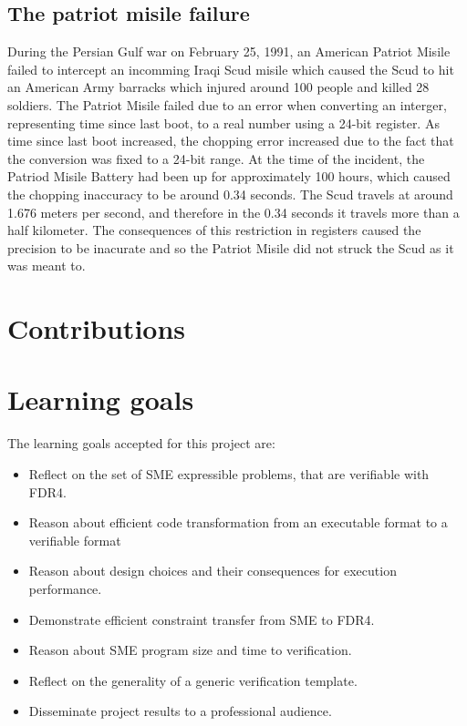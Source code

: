 \subsection{The patriot misile failure}
During the Persian Gulf war on February 25, 1991, an American Patriot Misile failed to intercept an incomming Iraqi Scud misile which caused the Scud to hit an American Army barracks which injured around 100 people and killed 28 soldiers. The Patriot Misile failed due to an error when converting an interger, representing time since last boot, to a real number using a 24-bit register. As time since last boot increased, the chopping error increased due to the fact that the conversion was fixed to a 24-bit range. At the time of the incident, the Patriod Misile Battery had been up for approximately 100 hours, which caused the chopping inaccuracy to be around 0.34 seconds. The Scud travels at around 1.676 meters per second, and therefore in the 0.34 seconds it travels more than a half kilometer. The consequences of this restriction in  registers caused the precision to be inacurate and so the Patriot Misile did not struck the Scud as it was meant to.

\section{Contributions} %

\section{Learning goals}
The learning goals accepted for this project are:
\begin{itemize}
\item Reflect on the set of SME expressible problems, that are verifiable with FDR4.
\item Reason about efficient code transformation from an executable format to a verifiable format
\item Reason about design choices and their consequences for execution performance.
\item Demonstrate efficient constraint transfer from SME to FDR4.
\item Reason about SME program size and time to verification.
\item Reflect on the generality of a generic verification template.
\item Disseminate project results to a professional audience.
\end{itemize}

